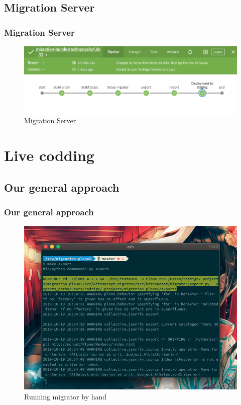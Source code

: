 \documentclass[aspectratio=169]{beamer}
\begin{document}
\subsection{Migration Server}
\begin{frame}
  \frametitle{Migration Server}
  \begin{figure}
    \includegraphics[width=\textwidth]{./img/008_-_Migration.png}
    \caption{Migration Server}
  \end{figure}
\end{frame}

\section{Live codding}
\subsection{Our general approach}
\begin{frame}
  \frametitle{Our general approach}
  \begin{figure}
    \includegraphics[height=.7\textheight]{./img/009_-_our_way.png}
    \caption{Running migrator by hand}
  \end{figure}
\end{frame}
\end{document}
